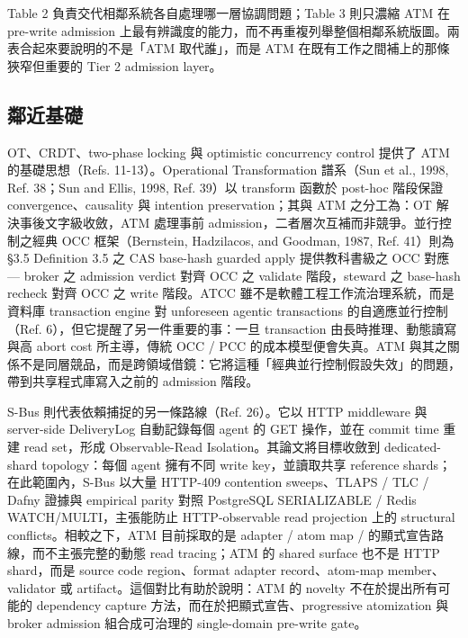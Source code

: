\documentclass[a4paper,fontset=none]{ctexart}
\begin{document}
Table 2 負責交代相鄰系統各自處理哪一層協調問題；Table 3 則只濃縮 ATM 在 pre-write admission 上最有辨識度的能力，而不再重複列舉整個相鄰系統版圖。兩表合起來要說明的不是「ATM 取代誰」，而是 ATM 在既有工作之間補上的那條狹窄但重要的 Tier 2 admission layer。

\subsection{鄰近基礎}

OT、CRDT、two-phase locking 與 optimistic concurrency control 提供了 ATM 的基礎思想（Refs. 11-13）。Operational Transformation 譜系（Sun et al., 1998, Ref. 38；Sun and Ellis, 1998, Ref. 39）以 transform 函數於 post-hoc 階段保證 convergence、causality 與 intention preservation；其與 ATM 之分工為：OT 解決事後文字級收斂，ATM 處理事前 admission，二者層次互補而非競爭。並行控制之經典 OCC 框架（Bernstein, Hadzilacos, and Goodman, 1987, Ref. 41）則為 §3.5 Definition 3.5 之 CAS base-hash guarded apply 提供教科書級之 OCC 對應 --- broker 之 admission verdict 對齊 OCC 之 validate 階段，steward 之 base-hash recheck 對齊 OCC 之 write 階段。ATCC 雖不是軟體工程工作流治理系統，而是資料庫 transaction engine 對 unforeseen agentic transactions 的自適應並行控制（Ref. 6），但它提醒了另一件重要的事：一旦 transaction 由長時推理、動態讀寫與高 abort cost 所主導，傳統 OCC / PCC 的成本模型便會失真。ATM 與其之關係不是同層競品，而是跨領域借鏡：它將這種「經典並行控制假設失效」的問題，帶到共享程式庫寫入之前的 admission 階段。

S-Bus 則代表依賴捕捉的另一條路線（Ref. 26）。它以 HTTP middleware 與 server-side DeliveryLog 自動記錄每個 agent 的 GET 操作，並在 commit time 重建 read set，形成 Observable-Read Isolation。其論文將目標收斂到 dedicated-shard topology：每個 agent 擁有不同 write key，並讀取共享 reference shards；在此範圍內，S-Bus 以大量 HTTP-409 contention sweeps、TLAPS / TLC / Dafny 證據與 empirical parity 對照 PostgreSQL SERIALIZABLE / Redis WATCH/MULTI，主張能防止 HTTP-observable read projection 上的 structural conflicts。相較之下，ATM 目前採取的是 adapter / atom map / \texttt{} 的顯式宣告路線，而不主張完整的動態 read tracing；ATM 的 shared surface 也不是 HTTP shard，而是 source code region、format adapter record、atom-map member、validator 或 artifact。這個對比有助於說明：ATM 的 novelty 不在於提出所有可能的 dependency capture 方法，而在於把顯式宣告、progressive atomization 與 broker admission 組合成可治理的 single-domain pre-write gate。
\end{document}
